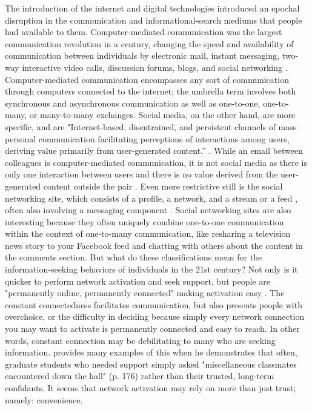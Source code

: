 The introduction of the internet and digital technologies introduced an epochal
disruption in the communication and informational-search mediums that people had
available to them. Computer-mediated communication was the largest communication
revolution in a century, changing the speed and availability of communication
between individuals by electronic mail, instant messaging, two-way interactive
video calls, discussion forums, blogs, and social networking
\citep{rainie2012networked}. Computer-mediated communication encompasses any
sort of communication through computers connected to the internet; the umbrella
term involves both synchronous and asynchronous communication as well as
one-to-one, one-to-many, or many-to-many exchanges. Social media, on the other
hand, are more specific, and are "Internet-based, disentrained, and persistent
channels of mass personal communication facilitating perceptions of interactions
among users, deriving value primarily from user-generated content.” \citep[][p.
50]{carr2015social}. While an email between colleagues is computer-mediated
communication, it is not social media as there is only one interaction between
users and there is no value derived from the user-generated content outside the
pair \citep{bayer_etal20}. Even more restrictive still is the social networking
site, which consists of a profile, a network, and a stream or a feed
\citep{boyd2007social, ellison2013sociality},  often also involving a messaging
component  \citep{bayer_etal20}. Social networking sites are also interesting
because they often uniquely combine one-to-one communication within the context
of one-to-many communication, like resharing a television news story to your
Facebook feed and chatting with others about the content in the comments
section. But what do these classifications mean for the information-seeking
behaviors of individuals in the 21st century? Not only is it quicker to perform
network activation and seek support, but people are "permanently online,
permanently connected" making activation easy \citep{vorderer2017permanently}.
The constant connectedness facilitates communication, but also presents people
with overchoice, or the difficulty in deciding because simply every
network connection you may want to activate is permanently connected and easy to
reach. In other words, constant connection may be debilitating to many who are
seeking information. \citet{smallSomeoneTalk2017} provides many examples of this
when he demonstrates that often, graduate students who needed
support simply asked "miscellaneous classmates encountered down the hall" (p.
176) rather than their trusted, long-term confidants. It seems that network
activation may rely on more than just trust; namely: convenience.

